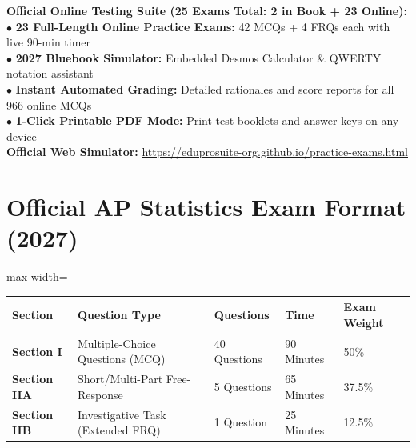 \begin{center}
\begin{tcolorbox}[standard jigsaw,width=0.95\linewidth,colback=NavyBlue!5!white,colframe=NavyBlue,title=\textbf{FREE DIGITAL WEB COMPANION \& 23 EXAMS SIMULATOR}]
\begin{minipage}{0.95\linewidth}
  \textbf{Official Online Testing Suite (25 Exams Total: 2 in Book + 23 Online):}\\
  $\bullet$ \textbf{23 Full-Length Online Practice Exams:} 42 MCQs + 4 FRQs each with live 90-min timer\\
  $\bullet$ \textbf{2027 Bluebook Simulator:} Embedded Desmos Calculator \& QWERTY notation assistant\\
  $\bullet$ \textbf{Instant Automated Grading:} Detailed rationales and score reports for all 966 online MCQs\\
  $\bullet$ \textbf{1-Click Printable PDF Mode:} Print test booklets and answer keys on any device\\[6pt]
  \textbf{Official Web Simulator:} \url{https://eduprosuite-org.github.io/practice-exams.html}
\end{minipage}
\end{tcolorbox}
\end{center}

\section*{Official AP Statistics Exam Format (2027)}
\begin{adjustbox}{max width=\linewidth}
\begin{tabular}{lllll}
\toprule
\textbf{Section} & \textbf{Question Type} & \textbf{Questions} & \textbf{Time} & \textbf{Exam Weight} \\
\midrule
\textbf{Section I} & Multiple-Choice Questions (MCQ) & 40 Questions & 90 Minutes & 50\% \\
\textbf{Section IIA} & Short/Multi-Part Free-Response & 5 Questions & 65 Minutes & 37.5\% \\
\textbf{Section IIB} & Investigative Task (Extended FRQ) & 1 Question & 25 Minutes & 12.5\% \\
\bottomrule
\end{tabular}
\end{adjustbox}

